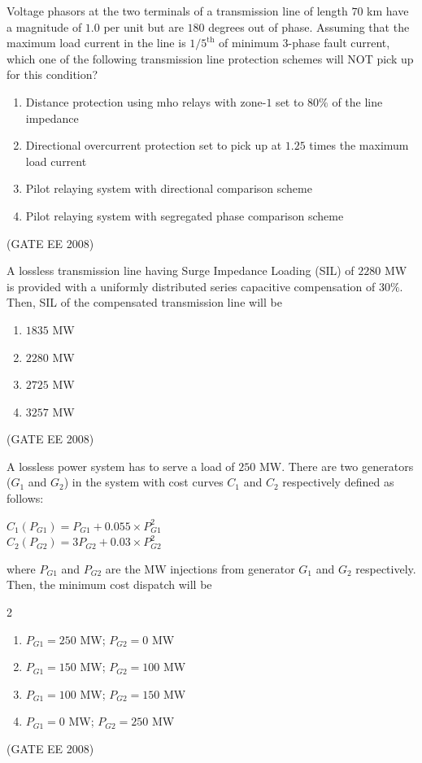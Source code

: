 \item Voltage phasors at the two terminals of a transmission line of length $70$ km have a magnitude of $1.0$ per unit but are $180$ degrees out of phase. Assuming that the maximum load current in the line is $1/5^{\text{th}}$ of minimum 3-phase fault current, which one of the following transmission line protection schemes will NOT pick up for this condition?

\begin{enumerate}
    \item Distance protection using mho relays with zone-$1$ set to $80\%$ of the line impedance
    \item Directional overcurrent protection set to pick up at $1.25$ times the maximum load current
    \item Pilot relaying system with directional comparison scheme
    \item Pilot relaying system with segregated phase comparison scheme
\end{enumerate}
\hfill (GATE EE 2008)



\item A lossless transmission line having Surge Impedance Loading (SIL) of $2280$ MW is provided with a uniformly distributed series capacitive compensation of $30 \%$. Then, SIL of the compensated transmission line will be

\begin{enumerate}
    \item $1835$ MW
    \item $2280$ MW
    \item $2725$ MW
    \item $3257$ MW
\end{enumerate}
\hfill (GATE EE 2008)


\item A lossless power system has to serve a load of $250$ MW. There are two generators ($G_1$ and $G_2$) in the system with cost curves $C_1$ and $C_2$ respectively defined as follows:
\begin{center}
$
C_1(P_{G1}) = P_{G1}+0.055 \times P_{G1}^2
$\\
$
C_2(P_{G2}) = 3P_{G2}+0.03 \times P_{G2}^2
$\\
\end{center}
where $P_{G1}$ and $P_{G2}$ are the MW injections from generator $G_1$ and $G_2$ respectively. Then, the minimum cost dispatch will be

\begin{multicols}{2}
\begin{enumerate}
    \item $P_{G1} = 250$ MW; $P_{G2} = 0$ MW
    \item $P_{G1} = 150$ MW; $P_{G2} = 100$ MW
    \item $P_{G1} = 100$ MW; $P_{G2} = 150$ MW
    \item $P_{G1} = 0$ MW; $P_{G2} = 250$ MW
\end{enumerate}
\end{multicols}
\hfill (GATE EE 2008)


